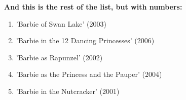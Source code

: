 \textbf{And this is the rest of the list, but with numbers:}

\begin{enumerate}
  \item 'Barbie of Swan Lake' (2003)
  \item 'Barbie in the 12 Dancing Princesses' (2006)
  \item 'Barbie as Rapunzel' (2002)
  \item 'Barbie as the Princess and the Pauper' (2004)
  \item 'Barbie in the Nutcracker' (2001)
\end{enumerate}










